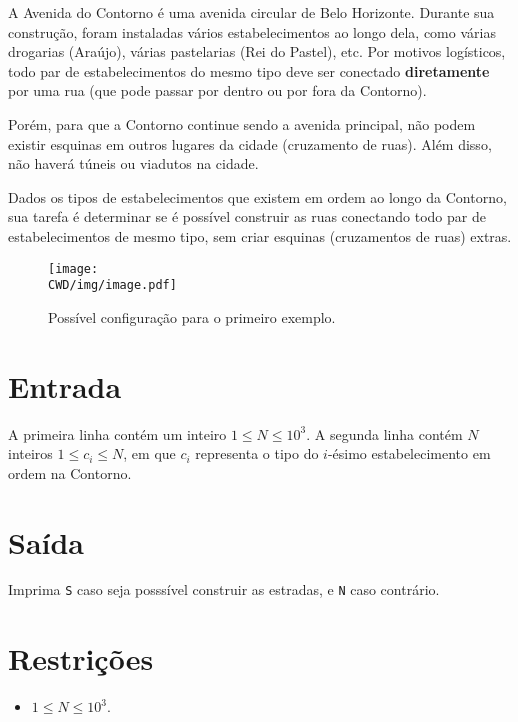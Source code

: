 %

A Avenida do Contorno é uma avenida circular de Belo Horizonte. Durante sua construção, foram instaladas vários estabelecimentos ao longo dela, como várias drogarias (Araújo), várias pastelarias (Rei do Pastel), etc. Por motivos logísticos, todo par de estabelecimentos do mesmo tipo deve ser conectado \textbf{diretamente} por uma rua (que pode passar por dentro ou por fora da Contorno).

Porém, para que a Contorno continue sendo a avenida principal, não podem existir esquinas em outros lugares da cidade (cruzamento de ruas). Além disso, não haverá túneis ou viadutos na cidade.

Dados os tipos de estabelecimentos que existem em ordem ao longo da Contorno, sua tarefa é determinar se é possível construir as ruas conectando todo par de estabelecimentos de mesmo tipo, sem criar esquinas (cruzamentos de ruas) extras.

\begin{figure}[H]
  \centering
  \texttt{[image: \\CWD/img/image.pdf]}
  \caption{Possível configuração para o primeiro exemplo.}
\end{figure}

%
%

\section*{Entrada}

A primeira linha contém um inteiro $1 \leq N \leq 10^3$. A segunda linha contém $N$ inteiros $1 \leq c_i \leq N$, em que $c_i$ representa o tipo do $i$-ésimo estabelecimento em ordem na Contorno.

%
%

\section*{Saída}

Imprima {\tt S} caso seja posssível construir as estradas, e {\tt N} caso contrário.

\section*{Restrições}

\begin{itemize}
\item $1 \leq N \leq 10^3$.
\end{itemize}


\exemplo
